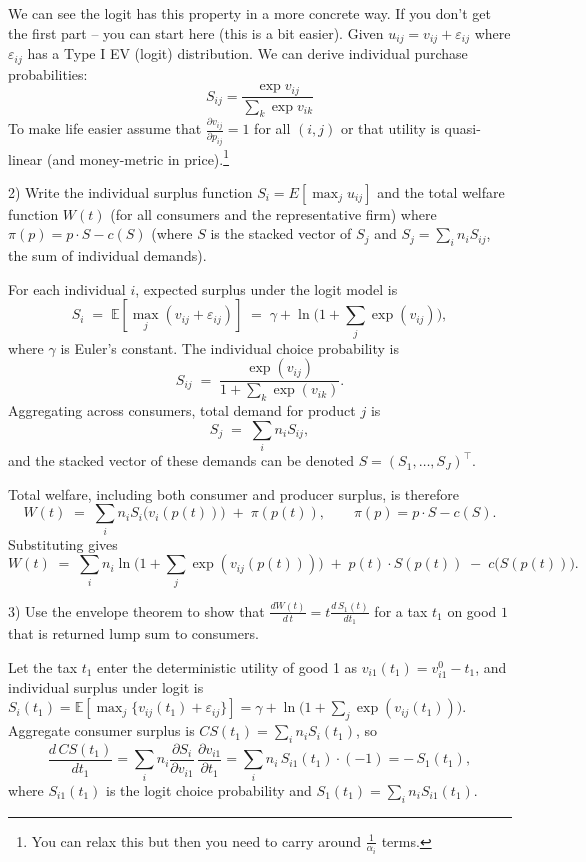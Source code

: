 \documentclass{article}
\begin{document}
\begin{tcolorbox}
We can see the logit has this property in a more concrete way. If you don't get the first part -- you can start here (this is a bit easier). Given $u_{ij} = v_{ij} + \varepsilon_{ij}$ where $\varepsilon_{ij}$ has a Type I EV (logit) distribution. We can derive individual purchase probabilities:
\[
S_{ij} = \frac{\exp v_{ij}}{\sum_k \exp v_{ik}}
\]
To make life easier assume that $\frac{\partial v_{ij}}{\partial p_{ij}}=1$ for all $(i,j)$ or that utility is quasi-linear (and money-metric in price).\footnote{You can relax this but then you need to carry around $\frac{1}{\alpha_i}$ terms.}
\end{tcolorbox}

\begin{tcolorbox}
2) Write the individual surplus function $S_i = E[\max_j u_{ij}]$ and the total welfare function $W(t)$ (for all consumers and the representative firm) where $\pi(p) = p \cdot S- c(S)$ (where $S$ is the stacked vector of $S_{j}$ and $S_j = \sum_i n_i S_{ij}$, the sum of individual demands).
\end{tcolorbox}

For each individual $i$, expected surplus under the logit model is
\[
S_i \;=\; \mathbb{E}\!\left[\max_j (v_{ij} + \varepsilon_{ij})\right]
\;=\; \gamma + \ln\!\Big(1 + \sum_{j} \exp(v_{ij})\Big),
\]
where $\gamma$ is Euler’s constant. The individual choice probability is
\[
S_{ij} \;=\; \frac{\exp(v_{ij})}{1 + \sum_{k} \exp(v_{ik})}.
\]
Aggregating across consumers, total demand for product $j$ is
\[
S_j \;=\; \sum_i n_i S_{ij},
\]
and the stacked vector of these demands can be denoted $S = (S_1, \ldots, S_J)^\top$.

Total welfare, including both consumer and producer surplus, is therefore
\[
W(t)
\;=\;
\sum_i n_i S_i\big(v_i(p(t))\big)
\;+\;
\pi(p(t)),
\qquad
\pi(p) = p \cdot S - c(S).
\]
Substituting gives
\[
W(t)
\;=\;
\sum_i n_i \ln\!\Big(1 + \sum_{j} \exp(v_{ij}(p(t)))\Big)
\;+\;
p(t) \cdot S(p(t))
\;-\;
c\!\big(S(p(t))\big).
\]




\begin{tcolorbox}
3) Use the envelope theorem to show that $\frac{d W(t)}{d\, t} = t \frac{d\, S_1(t)}{d t_1}$ for a tax $t_1$ on good $1$ that is returned lump sum to consumers.
\end{tcolorbox}

Let the tax $t_1$ enter the deterministic utility of good 1 as
$v_{i1}(t_1)=v_{i1}^0 - t_1$, and individual surplus under logit is
$S_i(t_1)=\mathbb{E}[\max_j\{v_{ij}(t_1)+\varepsilon_{ij}\}]
=\gamma+\ln\!\big(1+\sum_j \exp(v_{ij}(t_1))\big)$.
Aggregate consumer surplus is $CS(t_1)=\sum_i n_i S_i(t_1)$, so
\[
\frac{d\,CS(t_1)}{dt_1}
=\sum_i n_i\frac{\partial S_i}{\partial v_{i1}}\,\frac{\partial v_{i1}}{\partial t_1}
=\sum_i n_i\,S_{i1}(t_1)\cdot(-1)
=-\,S_1(t_1),
\]
where $S_{i1}(t_1)$ is the logit choice probability and $S_1(t_1)=\sum_i n_i S_{i1}(t_1)$.
\end{document}
